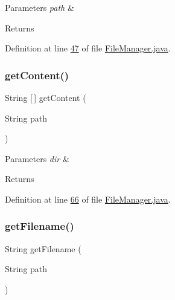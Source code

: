 \begin{DoxyParams}{Parameters}
{\em path} & \\
\hline
\end{DoxyParams}
\begin{DoxyReturn}{Returns}

\end{DoxyReturn}


Definition at line \hyperlink{_file_manager_8java_source_l00047}{47} of file \hyperlink{_file_manager_8java_source}{File\+Manager.\+java}.

\hypertarget{classfunctions_1_1_file_manager_a8d912a4b181b284e6c05e0f44f541e48}{}\label{classfunctions_1_1_file_manager_a8d912a4b181b284e6c05e0f44f541e48} 
\subsubsection{\texorpdfstring{get\+Content()}{getContent()}}
{\footnotesize\ttfamily String \mbox{[}$\,$\mbox{]} get\+Content (\begin{DoxyParamCaption}\item[{String}]{path }\end{DoxyParamCaption})}


\begin{DoxyParams}{Parameters}
{\em dir} & \\
\hline
\end{DoxyParams}
\begin{DoxyReturn}{Returns}

\end{DoxyReturn}


Definition at line \hyperlink{_file_manager_8java_source_l00066}{66} of file \hyperlink{_file_manager_8java_source}{File\+Manager.\+java}.

\hypertarget{classfunctions_1_1_file_manager_ad027758f34214960a7aa800e0f7c19db}{}\label{classfunctions_1_1_file_manager_ad027758f34214960a7aa800e0f7c19db} 
\subsubsection{\texorpdfstring{get\+Filename()}{getFilename()}}
{\footnotesize\ttfamily String get\+Filename (\begin{DoxyParamCaption}\item[{String}]{path }\end{DoxyParamCaption})}


